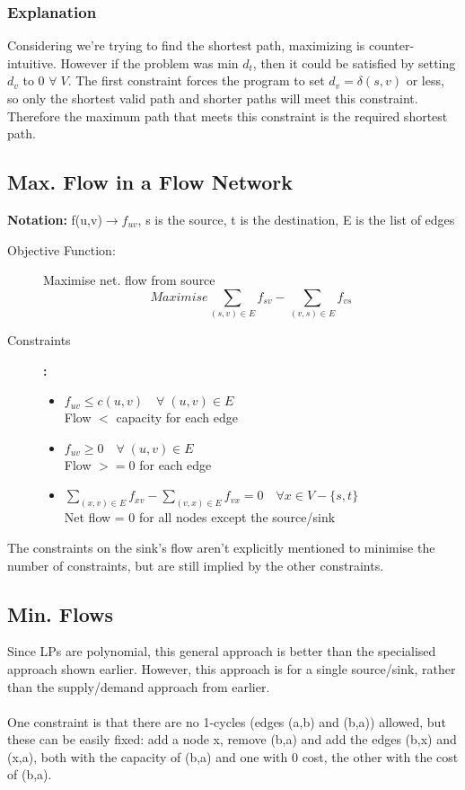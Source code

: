 \subsubsection{Explanation}
Considering we're trying to find the shortest path, maximizing is counter-intuitive. However if the problem was min $d_t$, then it could be satisfied by setting $d_v$ to 0 $\forall\; V$. The first constraint forces the program to set $d_v=\delta(s,v)$ or less, so only the shortest valid path and shorter paths will meet this constraint. Therefore the maximum path that meets this constraint is the required shortest path. 

\subsection{Max. Flow in a Flow Network}
\textbf{Notation:} f(u,v)$\rightarrow f_{uv}$, s is the source, t is the destination, E is the list of edges
\begin{description}
\item [Objective Function:] Maximise net. flow from source 
\begin{equation}
   Maximise \sum_{(s,v)\in E} f_{sv} - \sum_{(v,s)\in E} f_{vs} \nonumber
\end{equation} 
\item [Constraints]\textbf{:}  
\begin{itemize}
    \item \(f_{uv} \leq c(u,v) \quad \forall \;(u,v) \in E\) \\ Flow $<$ capacity for each edge
    \item \(f_{uv} \geq 0 \quad \forall \;(u,v) \in E\) \\ Flow $>=0$ for each edge
    \item \(\sum_{(x,v)\in E} f_{xv} - \sum_{(v,x)\in E} f_{vx} =0 \quad \forall x \in V-\{s,t\}\) \\ Net flow = 0 for all nodes except the source/sink
    \end{itemize}
\end{description}
The constraints on the sink's flow aren't explicitly mentioned to minimise the number of constraints, but are still implied by the other constraints.

\subsection{Min. Flows}
Since LPs are polynomial, this general approach is better than the specialised approach shown earlier. However, this approach is for a single source/sink, rather than the supply/demand approach from earlier.\\ \\
One constraint is that there are no 1-cycles (edges (a,b) and (b,a)) allowed, but these can be easily fixed: add a node x, remove (b,a) and add the edges (b,x) and (x,a), both with the capacity of (b,a) and one with 0 cost, the other with the cost of (b,a). 

